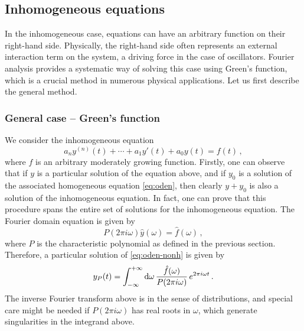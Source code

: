 \subsection{Inhomogeneous equations}
\label{sec:ih-ode}
In the inhomogeneous case, equations can have an arbitrary function on their right-hand
side. Physically, the right-hand side often represents an external interaction term on
the system, \eg a driving force in the case of oscillators. Fourier analysis provides a
systematic way of solving this case using Green's function, which is a crucial method in
numerous physical applications. Let us first describe the general method.
\subsubsection{General case -- Green's function}
We consider the inhomogeneous equation
\begin{equation}
  a_ny^{(n)}(t)+\cdots+a_1y'(t)+a_0y(t)=f(t)\,,\label{eq:oden-nonh}
\end{equation}
where $f$ is an arbitrary moderately growing function. Firstly, one can observe that if
$y$ is a particular solution of the equation above, and if $y_0$ is a solution of the
associated homogeneous equation \cref{eq:oden}, then clearly $y+y_0$ is also a solution of
the inhomogeneous equation. In fact, one can prove that this procedure spans the entire
set of solutions for the inhomogeneous equation. The Fourier domain equation is given by
\begin{equation}
  P(2\pi i\omega)\hat{y}(\omega)=\hat{f}(\omega)\,,
\end{equation}
where $P$ is the characteristic polynomial as defined in the previous section. Therefore,
a particular solution of \cref{eq:oden-nonh} is given by
\begin{equation}
  y_P(t)=\int_{-\infty}^{+\infty}\mathrm{d}{\omega}\,\frac{\hat{f}(\omega)}{P(2\pi i\omega)}\,e^{2\pi i \omega t}\,.
  \label{eq:oden-part}
\end{equation}
The inverse Fourier transform above is in the sense of distributions, and special care
might be needed if $P(2\pi i\omega)$ has real roots in $\omega$, which generate
singularities in the integrand above.

